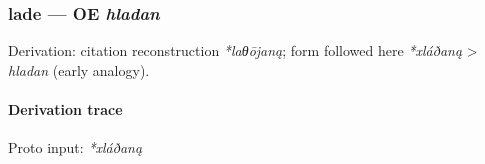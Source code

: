 \documentclass[
  british,
  a4paper,
]{article}
\begin{document}
\subsubsection{\texorpdfstring{lade --- OE
\emph{hladan}}{lade --- OE hladan}}\label{lade-oe-hladan}

Derivation: citation reconstruction \emph{*laθōjaną}; form followed here
\emph{*xláðaną} \textgreater{} \emph{hladan} (early analogy).

\paragraph{Derivation trace}\label{derivation-trace-122}

Proto input: \emph{*xláðaną}

\begingroup
\setlength{\fboxsep}{6pt}
\end{document}
